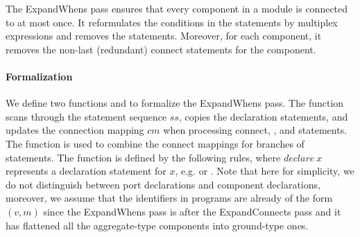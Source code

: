 
The ExpandWhens pass ensures that every component in a module is connected to at most once.
It reformulates the conditions in the  statements by multiplex expressions and removes the  statements. Moreover, for each component, it removes the non-last (redundant) connect statements for the component.

\paragraph*{Formalization} We define two functions {\expandbranch} and {\combinebranches} to formalize the ExpandWhens pass.
The function {\expandbranch} scans through the statement sequence $ss$, copies the declaration statements, and updates the connection mapping $cm$ when processing connect, , and  statements. The function {\combinebranches} is used to combine the connect mappings for branches of  statements.
The  {\expandbranch} function is defined by the following rules, %
where $\mathit{declare}\ x$ represents a declaration statement for $x$, e.g.  or . Note that here for simplicity, we do not distinguish between port declarations and component declarations, moreover, we assume that the identifiers in {\hifirrtl} programs are already of the form $(v, m)$ since the {ExpandWhens} pass is after the {ExpandConnects} pass and it has flattened all the aggregate-type components into ground-type ones. 
